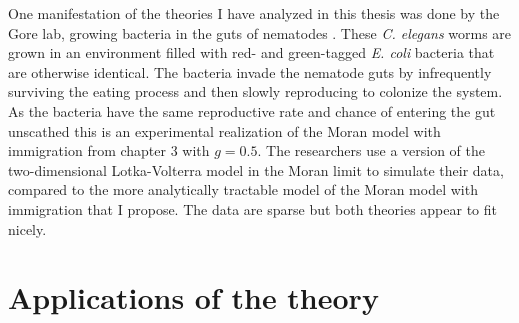 One manifestation of the theories I have analyzed in this thesis was done by the Gore lab, growing bacteria in the guts of nematodes \cite{Vega2017}. 
These \emph{C. elegans} worms are grown in an environment filled with red- and green-tagged \emph{E. coli} bacteria that are otherwise identical. 
The bacteria invade the nematode guts by infrequently surviving the eating process and then slowly reproducing to colonize the system. %
As the bacteria have the same reproductive rate and chance of entering the gut unscathed this is an experimental realization of the Moran model with immigration from chapter 3 with $g=0.5$. 
The researchers use a version of the two-dimensional Lotka-Volterra model in the Moran limit to simulate their data, compared to the more analytically tractable model of the Moran model with immigration that I propose. 
The data are sparse but both theories appear to fit nicely. 



\section{Applications of the theory}%

